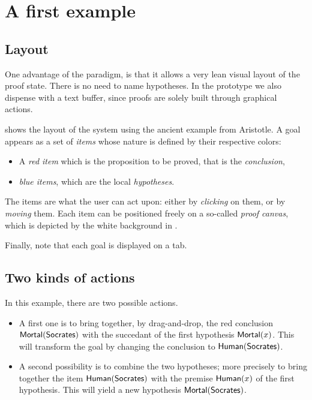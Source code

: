 
\section{A first example}

\subsection{Layout}
One advantage of the  paradigm, is that it allows a very lean visual layout
of the proof state. There is no need to name hypotheses. In the prototype we
also dispense with a text buffer, since proofs are solely built through
graphical actions.


 shows the layout of the system using the
ancient example from Aristotle. A goal appears as a set of {\em items}
whose nature is defined by their respective colors:
\begin{itemize}
\item A {\em red item} which is the proposition to be proved, that is the
 {\em conclusion},
\item {\em blue items}, which are the local {\em hypotheses}.
\end{itemize}

The items are what the user can act upon: either by {\em clicking} on them, or
by {\em moving} them. Each item can be positioned freely on a so-called
\emph{proof canvas}, which is depicted by the white background in
.

Finally, note that each goal is displayed on a tab.

\subsection{Two kinds of actions}
In this example, there are two possible actions.

\begin{itemize}
\item A first one is to bring together, by drag-and-drop, the red conclusion
$\mbox{\textsf{Mortal}}(\mbox{\textsf{Socrates}})$ with the succedant of the first hypothesis $\mbox{\textsf{Mortal}}(x)$.
This will transform the goal by changing the conclusion to $\mbox{\textsf{Human}}(\mbox{\textsf{Socrates}})$.
\item A second possibility is to combine the two hypotheses; more precisely to
bring together the item $\mbox{\textsf{Human}}(\mbox{\textsf{Socrates}})$ with the premise $\mbox{\textsf{Human}}(x)$ of the
first hypothesis. This will yield a new hypothesis $\mbox{\textsf{Mortal}}(\mbox{\textsf{Socrates}})$.
\end{itemize}

